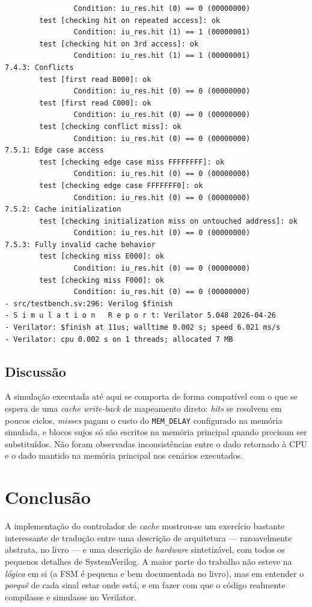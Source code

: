 \documentclass[12pt]{article}
\begin{document}
\begin{lstlisting}
                Condition: iu_res.hit (0) == 0 (00000000)
        test [checking hit on repeated access]: ok
                Condition: iu_res.hit (1) == 1 (00000001)
        test [checking hit on 3rd access]: ok
                Condition: iu_res.hit (1) == 1 (00000001)
7.4.3: Conflicts
        test [first read B000]: ok
                Condition: iu_res.hit (0) == 0 (00000000)
        test [first read C000]: ok
                Condition: iu_res.hit (0) == 0 (00000000)
        test [checking conflict miss]: ok
                Condition: iu_res.hit (0) == 0 (00000000)
7.5.1: Edge case access
        test [checking edge case miss FFFFFFFF]: ok
                Condition: iu_res.hit (0) == 0 (00000000)
        test [checking edge case FFFFFFF0]: ok
                Condition: iu_res.hit (0) == 0 (00000000)
7.5.2: Cache initialization
        test [checking initialization miss on untouched address]: ok
                Condition: iu_res.hit (0) == 0 (00000000)
7.5.3: Fully invalid cache behavior
        test [checking miss E000]: ok
                Condition: iu_res.hit (0) == 0 (00000000)
        test [checking miss F000]: ok
                Condition: iu_res.hit (0) == 0 (00000000)
- src/testbench.sv:296: Verilog $finish
- S i m u l a t i o n   R e p o r t: Verilator 5.048 2026-04-26
- Verilator: $finish at 11us; walltime 0.002 s; speed 6.021 ms/s
- Verilator: cpu 0.002 s on 1 threads; allocated 7 MB

\end{lstlisting}

\subsection{Discussão}

A simulação executada até aqui se comporta de forma compatível com
o que se espera de uma \emph{cache} \emph{write-back} de
mapeamento direto: \emph{hits} se resolvem em poucos ciclos,
\emph{misses} pagam o custo do \texttt{MEM\_DELAY} configurado na
memória simulada, e blocos sujos só são escritos na memória
principal quando precisam ser substituídos. Não foram observadas
inconsistências entre o dado retornado à CPU e o dado mantido na
memória principal nos cenários executados.

\section{Conclusão}

A implementação do controlador de \emph{cache} mostrou-se um
exercício bastante interessante de tradução entre uma descrição de
arquitetura --- razoavelmente abstrata, no livro --- e uma
descrição de \emph{hardware} sintetizável, com todos os pequenos
detalhes de SystemVerilog. A maior parte do trabalho não esteve na
\emph{lógica} em si (a FSM é pequena e bem documentada no livro),
mas em entender o \emph{porquê} de cada sinal estar onde está, e em
fazer com que o código realmente compilasse e simulasse no
Verilator.
\end{document}

